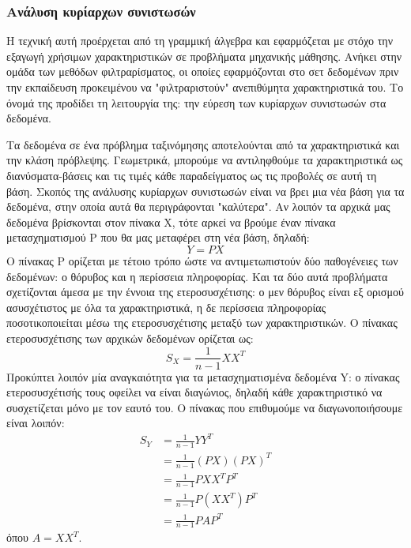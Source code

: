 \subsubsection{Ανάλυση κυρίαρχων συνιστωσών}
Η τεχνική αυτή προέρχεται από τη γραμμική άλγεβρα και εφαρμόζεται με στόχο την εξαγωγή χρήσιμων χαρακτηριστικών σε προβλήματα μηχανικής μάθησης. Ανήκει στην ομάδα των μεθόδων φιλτραρίσματος, οι οποίες εφαρμόζονται στο σετ δεδομένων πριν την εκπαίδευση προκειμένου να "φιλτραριστούν" ανεπιθύμητα χαρακτηριστικά του. Το όνομά της προδίδει τη λειτουργία της: την εύρεση των κυρίαρχων συνιστωσών στα δεδομένα.

Τα δεδομένα σε ένα πρόβλημα ταξινόμησης αποτελούνται από τα χαρακτηριστικά και την κλάση πρόβλεψης. Γεωμετρικά, μπορούμε να αντιληφθούμε τα χαρακτηριστικά ως διανύσματα-βάσεις και τις τιμές κάθε παραδείγματος ως τις προβολές σε αυτή τη βάση. Σκοπός της ανάλυσης κυρίαρχων συνιστωσών είναι να βρει μια νέα βάση για τα δεδομένα, στην οποία αυτά θα περιγράφονται "καλύτερα". Αν λοιπόν τα αρχικά μας δεδομένα βρίσκονται στον πίνακα Χ, τότε αρκεί να βρούμε έναν πίνακα μετασχηματισμού P που θα μας μεταφέρει στη νέα βάση, δηλαδή:
\begin{equation}
 Y=P X
\end{equation}
Ο πίνακας P ορίζεται με τέτοιο τρόπο ώστε να αντιμετωπιστούν δύο παθογένειες των δεδομένων: ο θόρυβος και η περίσσεια πληροφορίας. Και τα δύο αυτά προβλήματα σχετίζονται άμεσα με την έννοια της ετεροσυσχέτισης: ο μεν θόρυβος είναι εξ ορισμού ασυσχέτιστος με όλα τα χαρακτηριστικά, η δε περίσσεια πληροφορίας ποσοτικοποιείται μέσω της ετεροσυσχέτισης μεταξύ των χαρακτηριστικών. Ο πίνακας ετεροσυσχέτισης των αρχικών δεδομένων ορίζεται ως:
\begin{equation} 
S_X=\frac{1}{n-1} X X^T
\end{equation}
Προκύπτει λοιπόν μία αναγκαιότητα για τα μετασχηματισμένα δεδομένα Y: ο πίνακας ετεροσυσχέτισής τους οφείλει να είναι διαγώνιος, δηλαδή κάθε χαρακτηριστικό να συσχετίζεται μόνο με τον εαυτό του. Ο πίνακας που επιθυμούμε να διαγωνοποιήσουμε είναι λοιπόν:
\begin{equation} 
\begin{split}
S_Y & = \frac{1}{n-1} Y Y^T \\
& = \frac{1}{n-1} (PX)(PX)^T \\
& = \frac{1}{n-1} PXX^TP^T\\
& = \frac{1}{n-1} P(XX^T)P^T\\
& = \frac{1}{n-1} PAP^T
\end{split}
\end{equation}
όπου $A=XX^T$.

